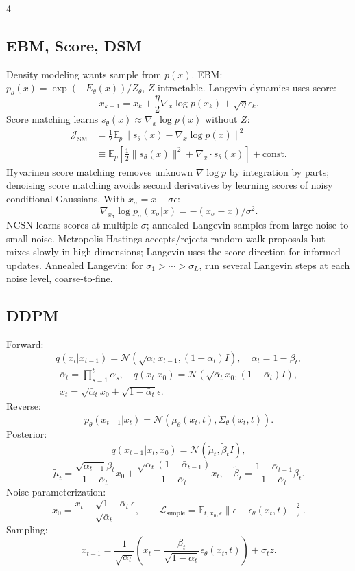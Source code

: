 \documentclass[8pt,a4paper,landscape]{extarticle}
\newcommand{\E}{\mathbb{E}}
\newcommand{\N}{\mathcal{N}}
\begin{document}
\begin{multicols*}{4}
\subsection{EBM, Score, DSM}
Density modeling wants sample from $p(x)$. EBM: $p_\theta(x)=\exp(-E_\theta(x))/Z_\theta$, $Z$ intractable. Langevin dynamics uses score:
\[
x_{k+1}=x_k+\frac{\eta}{2}\nabla_x\log p(x_k)+\sqrt{\eta}\epsilon_k.
\]
Score matching learns $s_\theta(x)\approx\nabla_x\log p(x)$ without $Z$:
\[
\begin{aligned}
\mathcal J_{\mathrm{SM}}
&=\frac12\E_p\|s_\theta(x)-\nabla_x\log p(x)\|^2\\
&\equiv \E_p\left[\frac12\|s_\theta(x)\|^2+\nabla_x\cdot s_\theta(x)\right]+\text{const}.
\end{aligned}
\]
Hyvarinen score matching removes unknown $\nabla\log p$ by integration by parts; denoising score matching avoids second derivatives by learning scores of noisy conditional Gaussians. With $x_\sigma=x+\sigma\epsilon$:
\[
\nabla_{x_\sigma}\log p_\sigma(x_\sigma|x)=-(x_\sigma-x)/\sigma^2.
\]
NCSN learns scores at multiple $\sigma$; annealed Langevin samples from large noise to small noise. Metropolis-Hastings accepts/rejects random-walk proposals but mixes slowly in high dimensions; Langevin uses the score direction for informed updates. Annealed Langevin: for $\sigma_1>\cdots>\sigma_L$, run several Langevin steps at each noise level, coarse-to-fine.

\subsection{DDPM}
Forward:
\[
q(x_t|x_{t-1})=\N(\sqrt{\alpha_t}x_{t-1},(1-\alpha_t)I),\quad \alpha_t=1-\beta_t,
\]
\[
\begin{gathered}
\bar\alpha_t=\prod_{s=1}^t\alpha_s,\quad
q(x_t|x_0)=\N(\sqrt{\bar\alpha_t}x_0,(1-\bar\alpha_t)I),\\
x_t=\sqrt{\bar\alpha_t}x_0+\sqrt{1-\bar\alpha_t}\epsilon.
\end{gathered}
\]
Reverse:
\[
p_\theta(x_{t-1}|x_t)=\N(\mu_\theta(x_t,t),\Sigma_\theta(x_t,t)).
\]
Posterior:
\[
q(x_{t-1}|x_t,x_0)=\N(\tilde\mu_t,\tilde\beta_tI),
\]
\[
\tilde\mu_t=\frac{\sqrt{\bar\alpha_{t-1}}\beta_t}{1-\bar\alpha_t}x_0+
\frac{\sqrt{\alpha_t}(1-\bar\alpha_{t-1})}{1-\bar\alpha_t}x_t,\quad
\tilde\beta_t=\frac{1-\bar\alpha_{t-1}}{1-\bar\alpha_t}\beta_t.
\]
Noise parameterization:
\[
x_0=\frac{x_t-\sqrt{1-\bar\alpha_t}\epsilon}{\sqrt{\bar\alpha_t}},
\qquad
\mathcal L_{\mathrm{simple}}=\E_{t,x_0,\epsilon}\|\epsilon-\epsilon_\theta(x_t,t)\|_2^2.
\]
Sampling:
\[
x_{t-1}=\frac{1}{\sqrt{\alpha_t}}\left(x_t-\frac{\beta_t}{\sqrt{1-\bar\alpha_t}}\epsilon_\theta(x_t,t)\right)+\sigma_tz.
\]


\end{multicols*}
\end{document}
